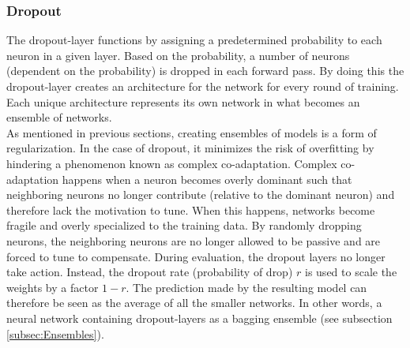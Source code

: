 \subsubsection*{Dropout}\label{subsubsec:Dropout}
The dropout-layer functions by assigning a predetermined probability to each neuron in a given layer. Based on the 
probability, a number of neurons (dependent on the probability) is dropped in each forward pass. By doing this the 
dropout-layer creates an architecture for the network for every round of training. Each unique architecture represents 
its own network in what becomes an ensemble of networks. 
\\
As mentioned in previous sections, creating ensembles of models is a form of regularization. In the case of 
dropout, it minimizes the risk of overfitting by hindering a phenomenon known as complex co-adaptation. Complex
co-adaptation happens when a neuron becomes overly dominant such that neighboring neurons no longer contribute (relative
to the dominant neuron) and therefore lack the motivation to tune. When this happens, networks become fragile and overly 
specialized to the training data. By randomly dropping neurons, the neighboring neurons are no longer allowed to be passive 
and are forced to tune to compensate. During evaluation, the dropout layers no longer take action. Instead, the dropout rate 
(probability of drop) $r$ is used to scale the weights by a factor $1-r$. The prediction made by the resulting 
model can therefore be seen as the average of all the smaller networks. In other words, a neural network containing dropout-layers 
as a bagging ensemble (see subsection \ref{subsec:Ensembles}). 

